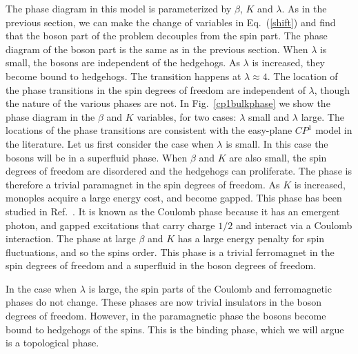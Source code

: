 \documentclass[prb,twocolumn]{revtex4-1}
\begin{document}
The phase diagram in this model is parameterized by $\beta$, $K$ and $\lambda$. As in the previous section, we can make the change of variables in Eq.~(\ref{shift}) and find that the boson part of the problem decouples from the spin part. The phase diagram of the boson part is the same as in the previous section. When $\lambda$ is small, the bosons are independent of the hedgehogs. As $\lambda$ is increased, they become bound to hedgehogs. The transition happens at $\lambda\approx 4$. 
The location of the phase transitions in the spin degrees of freedom are independent of $\lambda$, though the nature of the various phases are not. In Fig.~\ref{cp1bulkphase} we show the phase diagram in the $\beta$ and $K$ variables, for two cases: $\lambda$ small and $\lambda$ large. The locations of the phase transitions are consistent with the easy-plane $CP^1$ model in the literature.\cite{LesikSenthil} 
Let us first consider the case when $\lambda$ is small. In this case the bosons will be in a superfluid phase. When $\beta$ and $K$ are also small, the spin degrees of freedom are disordered and the hedgehogs can proliferate. The phase is therefore a trivial paramagnet in the spin degrees of freedom. 
As $K$ is increased, monoples acquire a large energy cost, and become gapped. This phase has been studied in Ref.~. It is known as the Coulomb phase because it has an emergent photon, and gapped excitations that carry charge $1/2$ and interact via a Coulomb interaction. 
The phase at large $\beta$ and $K$ has a large energy penalty for spin fluctuations, and so the spins order. This phase is a trivial ferromagnet in the spin degrees of freedom and a superfluid in the boson degrees of freedom. 

In the case when $\lambda$ is large, the spin parts of the Coulomb and ferromagnetic phases do not change. These phases are now trivial insulators in the boson degrees of freedom. However, in the paramagnetic phase the bosons become bound to hedgehogs of the spins. This is the binding phase, which we will argue is a topological phase.
 
\end{document}
